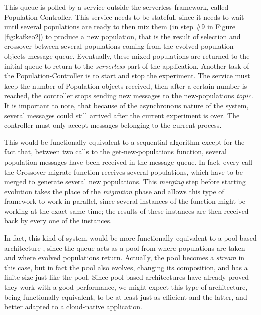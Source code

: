 \documentclass{llncs}
\begin{document}
  This queue is polled by a service outside the serverless framework, called
  {\sf Population-Controller}. This service needs to be stateful, since
  it needs to wait until several populations are ready to then mix them (in
  step \#9 in Figure \ref{fig:kafkeo2}) to produce a new population, that is the result of selection
  and crossover between several populations coming from the {\sf
    evolved-population-objects} message queue. Eventually, these mixed
  populations are returned to the initial queue to return to the {\em
    serverless} part of the application. Another task of the 
    {\sf Population-Controller} is to start and stop the experiment. The service must
    keep the number of Population objects received, then after
    a certain number is reached, the controller stops sending new messages to the
    {\sf new-populations} {\em topic}. It is important to note, that because of
    the asynchronous nature of the system, several messages could still
    arrived after the current experiment is over. The controller must only
    accept messages belonging to the current process.


  This would be functionally equivalent to a sequential algorithm except
  for the fact that, between two calls to the {\sf get-new-populations}
  function, several
  population-messages have been received in the message queue. In fact,
  every call the {\sf Crossover-migrate} function receives several populations, which
  have to be merged to generate several new populations. This {\em merging} step
  before starting evolution takes the place of the {\em migration} phase
  and allows this type of framework to work in parallel, since several
  instances of the function might be working at the exact same time; the
  results of these instances are then received back by every one of the
  instances.

  In fact, this kind of system would be more functionally equivalent to
  a pool-based architecture \cite{bollini1999distributed}, since the
  queue acts as a pool from where populations are taken and where
  evolved populations return. Actually, the pool becomes a {\em stream}
  in this case, but in fact the pool also evolves, changing its
  composition, and has a finite size just like the pool. Since
  pool-based architectures have already proved they work with a good
  performance, we might expect this type of architecture, being
  functionally equivalent, to be at least just as efficient and the
  latter, and better adapted to a cloud-native application.
\end{document}
